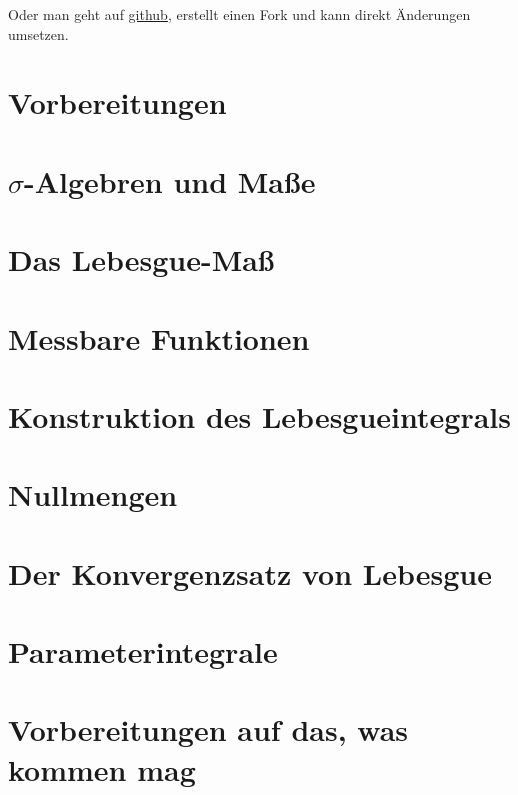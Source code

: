 \documentclass[a4paper,oneside,DIV15,BCOR12mm]{scrbook}
\begin{document}
Oder man geht auf \href{https://github.com/MartinThoma/LaTeX-examples/blob/master/documents/Analysis%20III/}{github},
erstellt einen Fork und kann direkt Änderungen umsetzen.


\renewcommand{\thechapter}{\arabic{chapter}}
\renewcommand{\chaptername}{§}
\renewcommand*{\chapterformat}{§\,\thechapter \enskip}
\setcounter{chapter}{-1}

\chapter{Vorbereitungen}
\label{Kapitel 0}


\chapter{$\sigma$-Algebren und Maße}
\label{Kapitel 1}


\chapter{Das Lebesgue-Maß}
\label{Kapitel 2}


\chapter{Messbare Funktionen}
\label{Kapitel 3}


\chapter{Konstruktion des Lebesgueintegrals}
\label{Kapitel 4}


\chapter{Nullmengen}
\label{Kapitel 5}


\chapter{Der Konvergenzsatz von Lebesgue}
\label{Kapitel 6}


\chapter{Parameterintegrale}
\label{Kapitel 7}


\chapter{Vorbereitungen auf das, was kommen mag}
\label{Kapitel 8}

\end{document}
